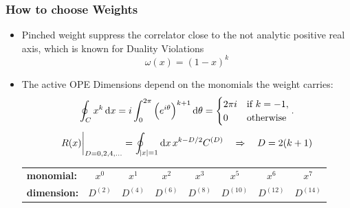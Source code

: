 \documentclass{beamer}
\begin{document}
\begin{frame}
  \frametitle{How to choose Weights}
  \begin{itemize}
  \item Pinched weight suppress the correlator close to the not analytic
    positive real axis, which is known for Duality Violations
    \begin{equation}
      \omega(x) = \left( 1 - x \right)^k
    \end{equation}

    \vfill

    \item The active OPE Dimensions depend on the monomials the weight carries:
      \begin{equation}
        \oint_{C} x^k \dif x = i \int_0^{2\pi}\left(e^{i \theta}\right)^{k+1} \dif \theta
        = \begin{cases} \mbox{\(2 \pi i\)} & \mbox{if } k=-1, \\ \mbox{0} & \mbox{otherwise} \end{cases}.
      \end{equation}
      \begin{equation}
        R(x)\biggr\rvert_{D=0,2,4,\dots} = \oint_{\abs{x}=1} \dif x \, x^{k-D/2} C^{(D)} \quad \Rightarrow \quad D = 2 (k+1)
      \end{equation}
      \begin{tabular}{l|ccccccc}
        \toprule
        \textbf{monomial:} & \(x^0\) & \(x^1\) & \(x^2\) & \(x^3\) & \(x^5\) & \(x^6\) & \(x^7\)\\
        \textbf{dimension:} & \(D^{(2)}\) & \(D^{(4)}\) & \(D^{(6)}\) & \(D^{(8)}\) & \(D^{(10)}\) & \(D^{(12)}\) & \(D^{(14)}\)\\
        \bottomrule 
      \end{tabular}
  \end{itemize}
\end{frame}
\end{document}
